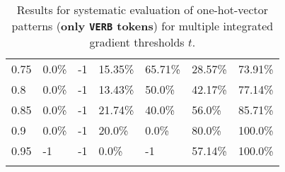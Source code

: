 \begin{table}[t]
\begin{tabular}{lllllll}
\multicolumn{1}{l|}{0.75}&  0.0\% & \multicolumn{1}{l|}{-1}& 15.35\% & \multicolumn{1}{l|}{65.71\%}& 28.57\% & 73.91\%\\ 
\multicolumn{1}{l|}{0.8}&  0.0\% & \multicolumn{1}{l|}{-1}& 13.43\% & \multicolumn{1}{l|}{50.0\%}& 42.17\% & 77.14\%\\ 
\multicolumn{1}{l|}{0.85}&  0.0\% & \multicolumn{1}{l|}{-1}& 21.74\% & \multicolumn{1}{l|}{40.0\%}& 56.0\% & 85.71\%\\ 
\multicolumn{1}{l|}{0.9}&  0.0\% & \multicolumn{1}{l|}{-1}& 20.0\% & \multicolumn{1}{l|}{0.0\%}& 80.0\% & 100.0\%\\ 
\multicolumn{1}{l|}{0.95}&  -1 & \multicolumn{1}{l|}{-1}& 0.0\% & \multicolumn{1}{l|}{-1}& 57.14\% & 100.0\%\\ 


\\ \hline
\end{tabular}
\caption[Model Evaluation for only \texttt{VERB} tokens]{Results for systematic evaluation of one-hot-vector patterns (\textbf{only \texttt{VERB} tokens}) for multiple integrated gradient thresholds $t$.}
\label{tab:evalResultsVERB}
\end{table}
	